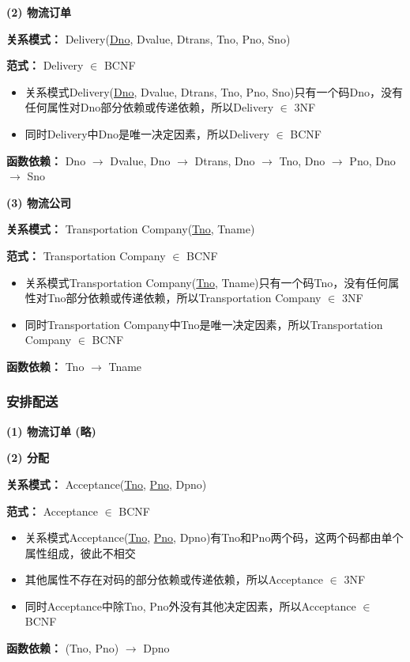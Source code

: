 \documentclass[12pt]{article}
\begin{document}
\vspace{0.3cm}
\noindent \textbf{(2) 物流订单} \par 
\noindent \textbf{关系模式：} Delivery(\uline{Dno}, Dvalue, Dtrans, Tno, Pno, Sno) \par 
\noindent \textbf{范式：} Delivery $\in$ BCNF \par 
\begin{itemize}
	\item 关系模式Delivery(\uline{Dno}, Dvalue, Dtrans, Tno, Pno, Sno)只有一个码Dno，没有任何属性对Dno部分依赖或传递依赖，所以Delivery $\in$ 3NF
	\item 同时Delivery中Dno是唯一决定因素，所以Delivery $\in$ BCNF
\end{itemize}
\textbf{函数依赖：} Dno $\rightarrow$ Dvalue, Dno $\rightarrow$ Dtrans, Dno $\rightarrow$ Tno, Dno $\rightarrow$ Pno, Dno $\rightarrow$ Sno

\vspace{0.3cm}
\noindent \textbf{(3) 物流公司} \par 
\noindent \textbf{关系模式：} Transportation Company(\uline{Tno}, Tname) \par 
\noindent \textbf{范式：} Transportation Company $\in$ BCNF \par 
\begin{itemize}
	\item 关系模式Transportation Company(\uline{Tno}, Tname)只有一个码Tno，没有任何属性对Tno部分依赖或传递依赖，所以Transportation Company $\in$ 3NF
	\item 同时Transportation Company中Tno是唯一决定因素，所以Transportation Company $\in$ BCNF
\end{itemize}
\textbf{函数依赖：} Tno $\rightarrow$ Tname

\subsubsection{安排配送}
\noindent \textbf{(1) 物流订单 (略)} 

\vspace{0.3cm}
\noindent \textbf{(2) 分配} \par 
\noindent \textbf{关系模式：} Acceptance(\uline{Tno}, \uline{Pno}, Dpno) \par 
\noindent \textbf{范式：} Acceptance $\in$ BCNF \par 
\begin{itemize}
	\item 关系模式Acceptance(\uline{Tno}, \uline{Pno}, Dpno)有Tno和Pno两个码，这两个码都由单个属性组成，彼此不相交
	\item 其他属性不存在对码的部分依赖或传递依赖，所以Acceptance $\in$ 3NF
	\item 同时Acceptance中除Tno, Pno外没有其他决定因素，所以Acceptance $\in$ BCNF
\end{itemize}
\textbf{函数依赖：} (Tno, Pno) $\rightarrow$ Dpno
\end{document}

